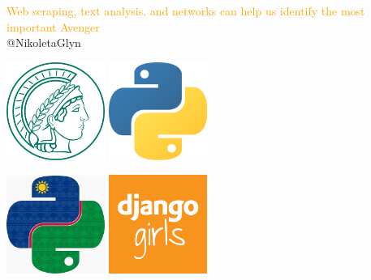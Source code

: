 \documentclass{beamer}
\begin{document}
\begin{frame}
    \begin{center}
        \large{\textcolor{orange}{Web scraping, text analysis, and networks can help us identify the most important Avenger}} \\

        \vspace{1cm}
        \normalsize{@NikoletaGlyn}

    \end{center}
\end{frame}

\begin{frame}
    \begin{center}
    \includegraphics[width=0.24\textwidth]{static/mpi.jpg}\hspace{8pt}
    \includegraphics[width=0.24\textwidth]{static/python.png}\vspace{8pt}

    \includegraphics[width=0.24\textwidth]{static/namibia.jpg}\hspace{8pt}
    \includegraphics[width=0.24\textwidth]{static/django_girls.png}
    \end{center}
\end{frame}
\end{document}

